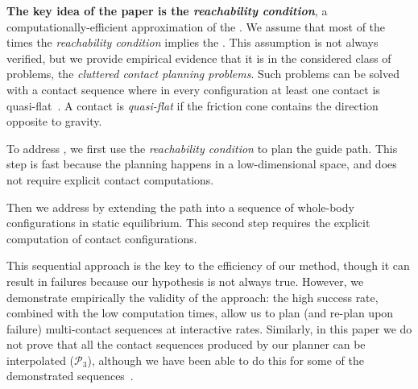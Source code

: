 \textbf{The key idea of the paper is the \textit{reachability condition}}, a computationally-efficient approximation of the .
We assume that most of the times the \textit{reachability condition} implies the .
This assumption is not always verified, but we provide empirical evidence that it is in the considered class of problems, the \textit{\gls{cluttered} contact planning problems}.
Such problems can be solved with a contact sequence 
where in every configuration at least one contact is \gls{quasi-flat}~\citep{Prete2016}. A contact is \textit{quasi-flat} if the friction cone contains the direction opposite to gravity. 

To address \Pa, we first use the \textit{reachability condition} to plan the guide path. This step is fast because the planning happens
in a low-dimensional space, and does not require explicit contact computations.

Then we address \Pb by extending the path into a sequence of whole-body configurations in static equilibrium.
This second step requires the explicit computation of contact configurations.

This sequential approach is the key to the efficiency of our method, though it
can result in failures because our hypothesis is not always true. However, we demonstrate empirically the validity of the approach: the high success rate, combined with the low computation times, allow us to plan (and re-plan upon failure) multi-contact sequences at \gls{interactive} rates.
Similarly, in this paper we do not  prove that all the contact sequences produced by our planner can be interpolated ($\mathcal{P}_3$), although we have been able to do this for some of the demonstrated sequences~\citep{Carpentier2016}. 

